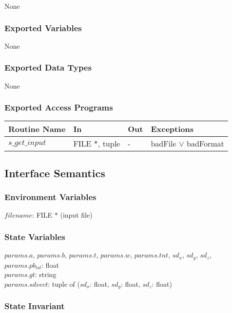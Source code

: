 \documentclass[12pt]{article}
\begin{document}
None

\subsubsection{Exported Variables}

None

\subsubsection{Exported Data Types}

None

\subsubsection{Exported Access Programs}

\begin{center}
\begin{tabular}{l l l l}\hline 
\textbf{Routine Name} & \textbf{In} &\textbf{Out} & \textbf{Exceptions} \\ \hline 
$s\_get\_input$ & FILE $\ast$, tuple & - & badFile $\vee$ badFormat \\ \hline
\end{tabular}
\end{center}

\subsection{Interface Semantics}

\subsubsection{Environment Variables}

$filename$: FILE $\ast$ (input file)

\subsubsection{State Variables}

$params.a$, $params.b$, $params.t$, $params.w$, $params.tnt$,
$sd_{x}$, $sd_{y}$, $sd_{z}$, \newline $params.pb_{tol}$: float \\
$params.gt$: string \\
$params.sdvect$: tuple of ($sd_{x}$: float, $sd_{y}$: float, $sd_{z}$: float)\\

\subsubsection{State Invariant}
\end{document}
